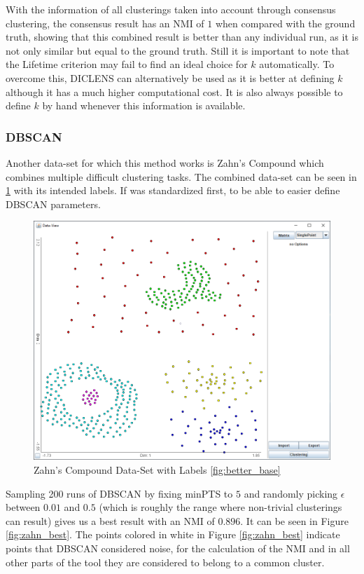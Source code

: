 \documentclass[
	a4paper,
	english,
	twoside,
	openright,               
	11pt                            
	]{report}
\begin{document}
With the information of all clusterings taken into account through consensus clustering, the consensus result has an NMI of $1$ when compared with the ground truth, showing that this combined result is better than any individual run, as it is not only similar but equal to the ground truth. Still it is important to note that the Lifetime criterion may fail to find an ideal choice for $k$ automatically. To overcome this, DICLENS can alternatively be used as it is better at defining $k$ although it has a much higher computational cost. It is also always possible to define $k$ by hand whenever this information is available.

\subsubsection{DBSCAN}
Another data-set for which this method works is Zahn's Compound \cite{1671676} which combines multiple difficult clustering tasks. The combined data-set can be seen in \ref{fig:zahn} with its intended labels. If was standardized first, to be able to easier define DBSCAN parameters.

\begin{figure}[h]
	\centering
	\includegraphics[scale=.4]{zahn}
	\caption{Zahn's Compound Data-Set with Labels \ref{fig:better_base}}
	\label{fig:zahn}
\end{figure}

Sampling 200 runs of DBSCAN by fixing minPTS to $5$ and randomly picking $\epsilon$ between $0.01$ and $0.5$ (which is roughly the range where non-trivial clusterings can result) gives us a best result with an NMI of $0.896$. It can be seen in Figure \ref{fig:zahn_best}. The points colored in white in Figure \ref{fig:zahn_best} indicate points that DBSCAN considered noise, for the calculation of the NMI and in all other parts of the tool they are considered to belong to a common cluster.
\end{document}
